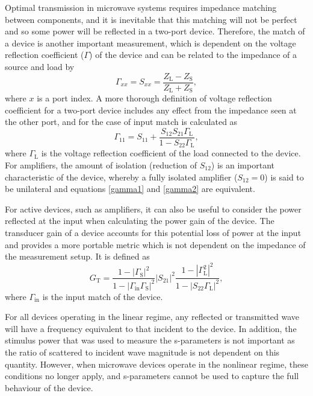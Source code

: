\documentclass[../thesis.tex]{subfiles}
\begin{document}
\begin{refsection}
Optimal transmission in microwave systems requires impedance matching between components, and it is inevitable that this matching will not be perfect and so some power will be reflected in a two-port device. Therefore, the match of a device is another important measurement, which is dependent on the voltage reflection coefficient ($\Gamma$) of the device and can be related to the impedance of a source and load by
\begin{equation}
\Gamma_{xx} = S_{xx} = \dfrac{Z_\textrm{L}-Z_\textrm{S}}{Z_\textrm{L}+Z_\textrm{S}},
\label{gamma1}
\end{equation}
where $x$ is a port index.
A more thorough definition of voltage reflection coefficient for a two-port device includes any effect from the impedance seen at the other port, and for the case of input match is calculated as
\begin{equation}
\Gamma_{11} = S_{11} + \dfrac{S_{12}S_{21}\Gamma_\textrm{L}}
{1-S_{22}\Gamma_\textrm{L}},
\label{gamma2}
\end{equation}
where $\Gamma_\textrm{L}$ is the voltage reflection coefficient of the load connected to the device. For amplifiers, the amount of isolation (reduction of $S_{12}$) is an important characteristic of the device, whereby a fully isolated amplifier ($S_{12}=0$) is said to be unilateral and equations \ref{gamma1} and \ref{gamma2} are equivalent.

For active devices, such as amplifiers, it can also be useful to consider the power reflected at the input when calculating the power gain of the device. The transducer gain of a device accounts for this potential loss of power at the input and provides a more portable metric which is not dependent on the impedance of the measurement setup. It is defined as
\begin{equation}
G_\textrm{T} = \dfrac{1-|\Gamma_\textrm{S}|^2}
{1-|\Gamma_\textrm{in}\Gamma_\textrm{S}|^2}
|S_{21}|^2
\dfrac{1-|\Gamma_\textrm{L}^2|^2}
{1-|S_{22}\Gamma_\textrm{L}|^2},
\end{equation}
where $\Gamma_\textrm{in}$ is the input match of the device.

For all devices operating in the linear regime, any reflected or transmitted wave will have a frequency equivalent to that incident to the device. In addition, the stimulus power that was used to measure the s-parameters is not important as the ratio of scattered to incident wave magnitude is not dependent on this quantity. However, when microwave devices operate in the nonlinear regime, these conditions no longer apply, and s-parameters cannot be used to capture the full behaviour of the device.


\end{refsection}
\end{document}
